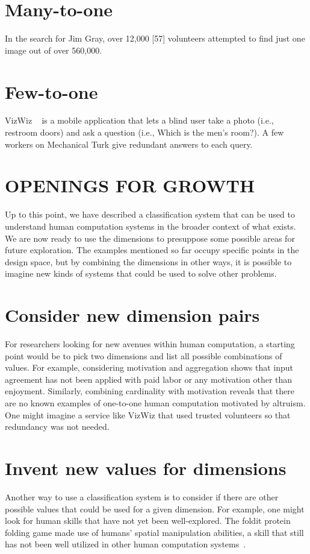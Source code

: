 \documentclass{acm_proc_article-sp}
\begin{document}
\section*{Many-to-one}
In the search for Jim Gray, over 12,000 [57] volunteers attempted to find just one image out of over 560,000.
\section*{Few-to-one}
VizWiz ~\cite{bigham2010} is a mobile application that lets a blind user take a photo (i.e., restroom doors) and ask a question (i.e., Which is the men's room?). A few workers on Mechanical Turk give redundant answers to each query.
\section*{OPENINGS FOR GROWTH}
Up to this point, we have described a classification system that can be used to understand human computation systems in the broader context of what exists. We are now ready to use the dimensions to presuppose some possible areas for future exploration. The examples mentioned so far occupy specific points in the design space, but by combining the dimensions in other ways, it is possible to imagine new kinds of systems that could be used to solve other problems.
\section*{Consider new dimension pairs}
For researchers looking for new avenues within human computation, a starting point would be to pick two dimensions and list all possible combinations of values. For example, considering motivation and aggregation shows that input agreement has not been applied with paid labor or any motivation other than enjoyment. Similarly, combining cardinality with motivation reveals that there are no known examples of one-to-one human computation motivated by altruism. One might imagine a service like VizWiz that used trusted volunteers so that redundancy was not needed.

\section*{Invent new values for dimensions}
Another way to use a classification system is to consider if there are other possible values that could be used for a given dimension. For example, one might look for human skills that have not yet been well-explored. The foldit protein folding game made use of humans' spatial manipulation abilities, a skill that still has not been well utilized in other human computation systems~\cite{cooper2010pre}.
\end{document}
